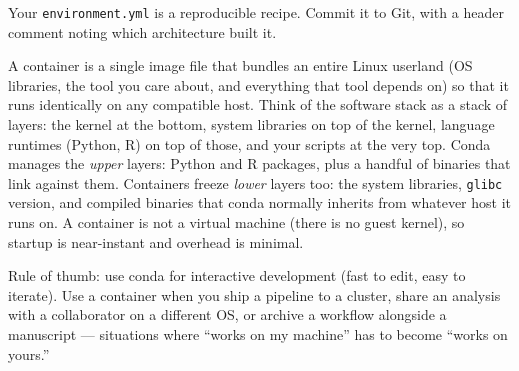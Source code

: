 \begin{winbox}[Checkpoint]
Your \texttt{environment.yml} is a reproducible recipe. Commit it to Git, with a header comment noting which architecture built it.
\end{winbox}

\begin{brainbox}
A container is a single image file that bundles an entire Linux userland (OS libraries, the tool you care about, and everything that tool depends on) so that it runs identically on any compatible host. Think of the software stack as a stack of layers: the kernel at the bottom, system libraries on top of the kernel, language runtimes (Python, R) on top of those, and your scripts at the very top. Conda manages the \textit{upper} layers: Python and R packages, plus a handful of binaries that link against them. Containers freeze \textit{lower} layers too: the system libraries, \texttt{glibc} version, and compiled binaries that conda normally inherits from whatever host it runs on. A container is not a virtual machine (there is no guest kernel), so startup is near-instant and overhead is minimal.

Rule of thumb: use conda for interactive development (fast to edit, easy to iterate). Use a container when you ship a pipeline to a cluster, share an analysis with a collaborator on a different OS, or archive a workflow alongside a manuscript --- situations where ``works on my machine'' has to become ``works on yours.''
\end{brainbox}

